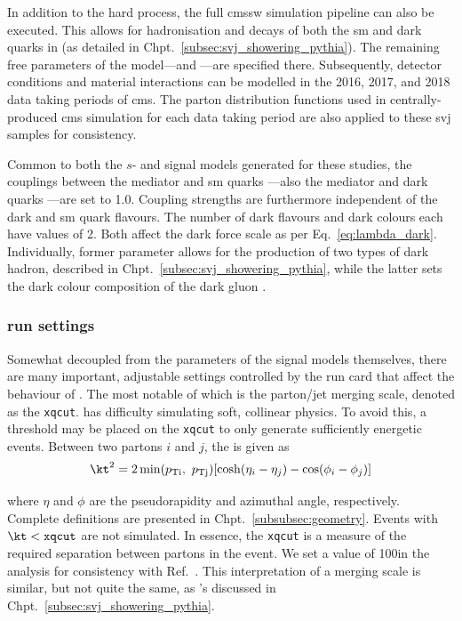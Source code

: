 In addition to the hard process, the full \acrshort{cmssw} simulation pipeline can also be executed. This allows for hadronisation and decays of both the \acrshort{sm} and dark quarks in \PYTHIA (as detailed in Chpt.~\ref{subsec:svj_showering_pythia}). The remaining free parameters of the model---\aDark and \rinv---are specified there. Subsequently, detector conditions and material interactions can be modelled in the 2016, 2017, and 2018 data taking periods of \acrshort{cms}. The parton distribution functions used in centrally-produced \acrshort{cms} simulation for each data taking period are also applied to these \gls{svj} samples for consistency.

Common to both the $s$- and \tchannel signal models generated for these studies, the couplings between the mediator and \acrshort{sm} quarks \gq---also the mediator and dark quarks \gqdark---are set to 1.0. Coupling strengths are furthermore independent of the dark and \acrshort{sm} quark flavours. The number of dark flavours \Nf and dark colours \Nc each have values of 2. Both affect the dark force scale as per Eq.~\ref{eq:lambda_dark}. Individually, former parameter allows for the production of two types of dark hadron, described in Chpt.~\ref{subsec:svj_showering_pythia}, while the latter sets the dark colour composition of the dark gluon \Pgdark. 




\subsubsection{\texorpdfstring{\MADGRAPH}{MadGraph} run settings}
\label{subsubsec:svj_mg_run_settings}

Somewhat decoupled from the parameters of the signal models themselves, there are many important, adjustable settings controlled by the run card that affect the behaviour of \MADGRAPH. The most notable of which is the parton/\gls{jet} merging scale, denoted as the \texttt{xqcut}. \MADGRAPH has difficulty simulating soft, collinear physics. To avoid this, a threshold may be placed on the \texttt{xqcut} to only generate sufficiently energetic events. Between two partons $i$ and $j$, the \kt is given as
\begin{equation}
    \kt^2 = 2 \min(p_{\mathrm{Ti}}, \ p_{\mathrm{Tj}}) [\cosh(\eta_i - \eta_j) - \cos(\phi_i - \phi_j)]
    \label{eq:svj_mg_kt}
\end{equation}

where $\eta$ and $\phi$ are the pseudorapidity and azimuthal angle, respectively. Complete definitions are presented in Chpt.~\ref{subsubsec:geometry}. Events with $\kt < \texttt{xqcut}$ are not simulated. In essence, the \texttt{xqcut} is a measure of the required separation between partons in the event. We set a value of 100\GeV in the analysis for consistency with Ref.~. This interpretation of a merging scale is similar, but not quite the same, as \PYTHIA's discussed in Chpt.~\ref{subsec:svj_showering_pythia}.

